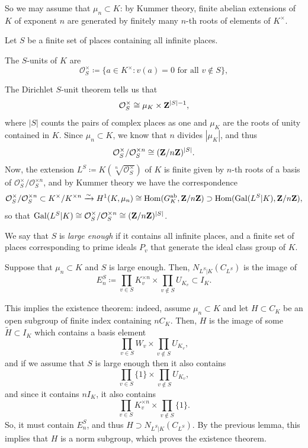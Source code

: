 \documentclass{article}
\begin{document}
So we may assume that $\mu_n \subset K$: by Kummer theory, finite abelian extensions of $K$ of exponent $n$ are generated by finitely many $n$-th roots of elements of $K^\times$.

Let $S$ be a finite set of places containing all infinite places.
\begin{defn}
		The $S$-units of $K$ are
		\[
			\mathcal{O}_S^\times \coloneqq \{a\in K^\times : v(a)=0 \text{ for all }v\notin S\},
		\]
\end{defn}
The Dirichlet $S$-unit theorem tells us that
\[
	\mathcal{O}_S^\times \cong \mu_K \times \mathbf{Z}^{|S|-1},
\]
where $|S|$ counts the pairs of complex places as one and $\mu_K$ are the roots of unity contained in $K$. Since $\mu_n\subset K$, we know that $n$ divides $|\mu_K|$, and thus
\[
	\mathcal{O}_S^\times / \mathcal{O}_S^{\times n} \cong (\mathbf{Z}/n\mathbf{Z})^{|S|}.
\]
Now, the extension $L^S\coloneqq K(\sqrt[n]{\mathcal{O}_S^\times})$ of $K$ is finite given by $n$-th roots of a basis of $\mathcal{O}_S^\times / \mathcal{O}_S^{\times n}$, and by Kummer theory we have the correspondence
\[
	\mathcal{O}_S^\times/ \mathcal{O}_S^{\times n} \subset K^\times / K^{\times n} \xrightarrow{\sim} H^1(K,\mu_n) \cong \operatorname{Hom}(G_K^\text{ab},\mathbf{Z}/n\mathbf{Z})\supset \operatorname{Hom}(\operatorname{Gal}(L^S|K),\mathbf{Z}/n\mathbf{Z}),
\]
so that $\operatorname{Gal}(L^S|K)\cong \mathcal{O}_S^\times / \mathcal{O}_S^{\times n} \cong (\mathbf{Z} / n\mathbf{Z})^{|S|}$.

\begin{defn}
		We say that $S$ is \emph{large enough} if it contains all infinite places, and a finite set of places corresponding to prime ideals $P_v$ that generate the ideal class group of $K$.
\end{defn}

\begin{prop}
		Suppose that $\mu_n\subset K$ and $S$ is large enough. Then, $N_{L^S|K}(C_{L^S})$ is the image of
		\[
			E^S_n\coloneqq \prod_{v\in S} K_v^{\times n} \times \prod_{v\notin S} U_{K_v} \subset I_K.
		\]
\end{prop}
This implies the existence theorem: indeed, assume $\mu_n\subset K$ and let $H\subset C_K$ be an open subgroup of finite index containing $n C_K$. Then, $H$ is the image of some $\widetilde{H}\subset I_K$ which contains a basis element 
\[
	\prod_{v\in S} W_v \times \prod_{v\notin S} U_{K_v},
\]
and if we assume that $S$ is large enough then it also contains
\[
	\prod_{v\in S} \{1\} \times \prod_{v\notin S} U_{K_v},
\]
and since it contains $n I_K$, it also contains 
\[
		\prod_{v\in S} K_v^{\times n} \times \prod_{v\notin S} \{1\}.
\]
So, it must contain $E^S_n$, and thus $H\supset N_{L^S|K}(C_{L^S})$. By the previous lemma, this implies that $H$ is a norm subgroup, which proves the existence theorem.
\end{document}
